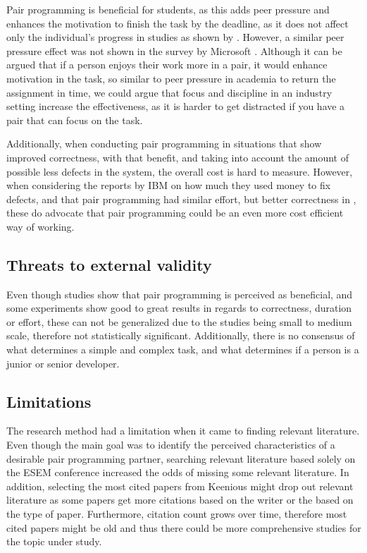 \documentclass[conference]{IEEEtran}
\begin{document}
Pair programming is beneficial for students, as this adds peer pressure and enhances the motivation to finish the task by the deadline, as it does not affect only the individual's progress in studies as shown by \cite{Williams2000Strengthening}. However, a similar peer pressure effect was not shown in the survey by Microsoft \cite{10.1145/1414004.1414026}. Although it can be argued that if a person enjoys their work more in a pair, it would enhance motivation in the task, so similar to peer pressure in academia to return the assignment in time, we could argue that focus and discipline in an industry setting increase the effectiveness, as it is harder to get distracted if you have a pair that can focus on the task.

Additionally, when conducting pair programming in situations that show improved correctness, with that benefit, and taking into account the amount of possible less defects in the system, the overall cost is hard to measure. However, when considering the reports by IBM \cite{10.5555/377517.377531} on how much they used money to fix defects, and that pair programming had similar effort, but better correctness in \cite{10.1145/1159733.1159749}, these do advocate that pair programming could be an even more cost efficient way of working.

\subsection{Threats to external validity}

Even though studies show that pair programming is perceived as beneficial, and some experiments show good to great results in regards to correctness, duration or effort, these can not be generalized due to the studies being small to medium scale, therefore not statistically significant. Additionally, there is no consensus of what determines a simple and complex task, and what determines if a person is a junior or senior developer.

\subsection{Limitations}

The research method had a limitation when it came to finding relevant literature. Even though the main goal was to identify the perceived characteristics of a desirable pair programming partner, searching relevant literature based solely on the ESEM conference increased the odds of missing some relevant literature. In addition, selecting the most cited papers from Keenious might drop out relevant literature as some papers get more citations based on the writer or the based on the type of paper. Furthermore, citation count grows over time, therefore most cited papers might be old and thus there could be more comprehensive studies for the topic under study.
\end{document}
